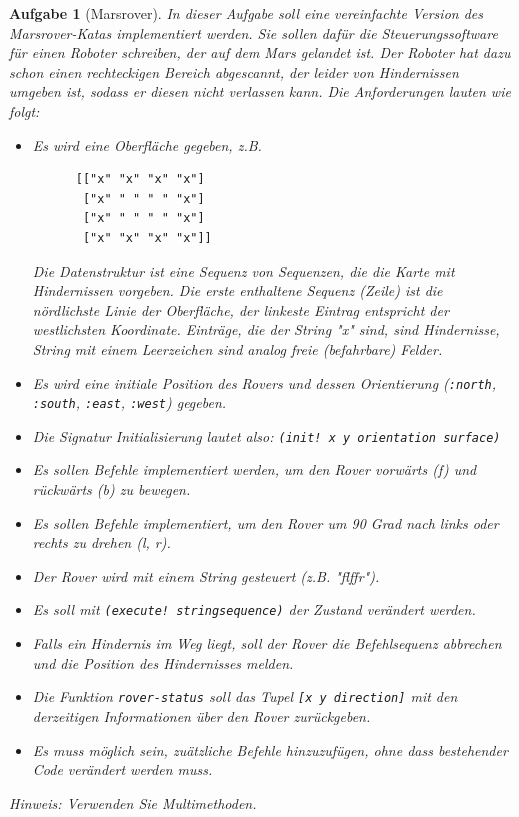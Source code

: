 \documentclass[11pt,a4paper]{article}
\newcounter{numb}
\theoremstyle{break}
\newtheorem{aufgabe}{Aufgabe}[numb]
\begin{document}
\begin{aufgabe}[Marsrover]
In dieser Aufgabe soll eine vereinfachte Version des Marsrover-Katas implementiert werden.
Sie sollen daf\"ur die Steuerungssoftware f\"ur einen Roboter schreiben,
der auf dem Mars gelandet ist.
Der Roboter hat dazu schon einen rechteckigen Bereich abgescannt,
der leider von Hindernissen umgeben ist, sodass er diesen nicht verlassen kann.
Die Anforderungen lauten wie folgt:

\begin{itemize}
    \item Es wird eine Oberfl\"ache gegeben, z.B.
        \begin{verbatim}
      [["x" "x" "x" "x"]
       ["x" " " " " "x"]
       ["x" " " " " "x"]
       ["x" "x" "x" "x"]]
\end{verbatim}

        Die Datenstruktur ist eine Sequenz von Sequenzen, die die Karte mit Hindernissen vorgeben.
        Die erste enthaltene Sequenz (Zeile) ist die n\"ordlichste Linie der Oberfl\"ache, der
        linkeste Eintrag entspricht der westlichsten Koordinate.
        Eintr\"age, die der String "x" sind, sind Hindernisse, String mit einem Leerzeichen
        sind analog freie (befahrbare) Felder.
    \item Es wird eine initiale Position des Rovers und dessen Orientierung (\verb|:north|, \verb|:south|, \verb|:east|, \verb|:west|) gegeben.
    \item Die Signatur Initialisierung lautet also: \verb|(init! x y orientation surface)|
    \item Es sollen Befehle implementiert werden, um den Rover vorw\"arts (f) und r\"uckw\"arts (b) zu bewegen.
    \item Es sollen Befehle implementiert, um den Rover um 90 Grad nach links oder rechts zu drehen (l, r).
    \item Der Rover wird mit einem String gesteuert (z.B. "flffr").
    \item Es soll mit \verb|(execute! stringsequence)| der Zustand ver\"andert werden.
    \item Falls ein Hindernis im Weg liegt, soll der Rover die Befehlsequenz abbrechen
        und die Position des Hindernisses melden.
    \item Die Funktion \verb|rover-status| soll das Tupel \verb|[x y direction]| mit den derzeitigen Informationen \"uber den Rover zur\"uckgeben.
    \item Es muss m\"oglich sein, zu\"atzliche Befehle hinzuzuf\"ugen,
        \emph{ohne dass bestehender Code ver\"andert werden muss}.
\end{itemize}

        Hinweis: Verwenden Sie Multimethoden.
\end{aufgabe}
\end{document}

